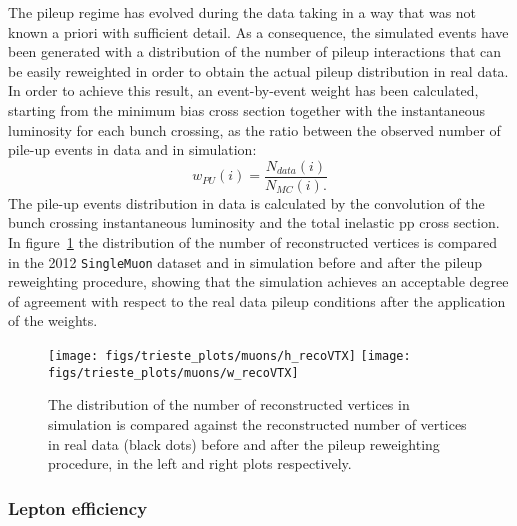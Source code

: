 The pileup regime has evolved during the data taking in a way that was not known 
a priori with sufficient detail. 
As a consequence, the simulated events have been generated with a 
distribution of the number of pileup interactions that can be easily reweighted in
order to obtain the actual pileup distribution in real data.
In order to achieve this result, an event-by-event weight has been calculated, starting from
the minimum bias cross section together with the instantaneous luminosity for each bunch crossing,
as the ratio between the observed number of pile-up events in data and in simulation:
$$ w_{PU}(i) = \frac{N_{data}(i)}{N_{MC}(i) \mathrm{.}}$$
The pile-up events distribution in data is calculated by the convolution of the 
bunch crossing instantaneous luminosity and the total inelastic pp cross section.
In figure~\ref{fig:pileupreweighting} the distribution of the number of 
reconstructed vertices is compared 
in the 2012 \texttt{SingleMuon} dataset and in simulation before and after the 
pileup reweighting procedure, showing that the simulation achieves an acceptable degree
of agreement with respect to the real data pileup conditions after the 
application of the weights.

\begin{figure}[htb]
	\begin{center}
		\leavevmode
		\texttt{[image: figs/trieste\_plots/muons/h\_recoVTX]}
		\texttt{[image: figs/trieste\_plots/muons/w\_recoVTX]}
	\end{center}
	\caption{The distribution of the number of reconstructed vertices in simulation is 
          compared against 
          the reconstructed number of vertices in real data (black dots) before and 
          after the pileup reweighting procedure, in the left and right plots respectively.}
	\label{fig:pileupreweighting}
\end{figure}

\subsubsection{Lepton efficiency}
\label{sec:tagandprobe}

